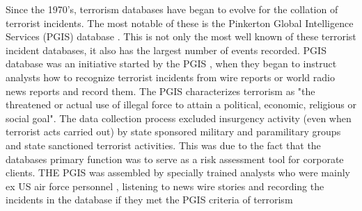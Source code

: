 Since the 1970's, terrorism databases have began to evolve for the collation of terrorist incidents. The most notable of these is the Pinkerton Global Intelligence Services (PGIS) database \citep{dugan2006first}. This is not only the most well known of these terrorist incident databases, it also has the largest number of events recorded. PGIS database was an initiative started by the PGIS \citep{sheehan2012assessing}, when they began to instruct analysts how to recognize terrorist incidents from wire reports or world radio news reports and record them. The PGIS characterizes terrorism as "the threatened or actual use of illegal force to attain a political, economic, religious or social goal". The data collection process excluded insurgency activity (even when terrorist acts carried out) by state sponsored military and paramilitary groups and state sanctioned terrorist activities. This was due to the fact that the databases primary function was to serve as a risk assessment tool for corporate clients. THE PGIS was assembled by specially trained analysts who were mainly ex US air force personnel \citep{fivethirtyeightGTD2015}, listening to news wire stories and recording the incidents in the database if they met the PGIS criteria of terrorism 


